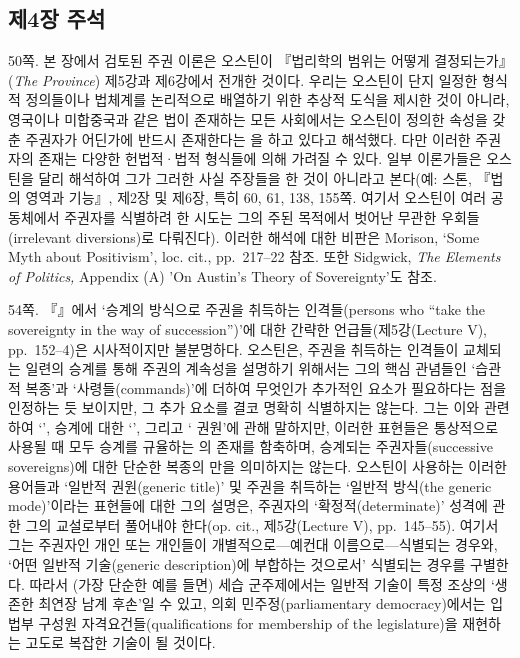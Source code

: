 \newpage

\subsection{제4장 주석}\label{uxc81c4uxc7a5-uxc8fcuxc11d}


{\footnotesize
\noteentry 50쪽.  본 장에서 검토된 주권 이론은 오스틴이
『법리학의 범위는 어떻게 결정되는가』(\emph{The Province}) 제5강과
제6강에서 전개한 것이다. 우리는 오스틴이 단지 일정한 형식적 정의들이나
법체계를 논리적으로 배열하기 위한 추상적 도식을 제시한 것이 아니라,
영국이나 미합중국과 같은 법이 존재하는 모든 사회에서는 오스틴이 정의한
속성을 갖춘 주권자가 어딘가에 반드시 존재한다는 을 하고 있다고 해석했다. 다만 이러한 주권자의 존재는 다양한
헌법적·법적 형식들에 의해 가려질 수 있다. 일부 이론가들은 오스틴을 달리
해석하여 그가 그러한 사실 주장들을 한 것이 아니라고 본다(예: 스톤,
『법의 영역과 기능』, 제2장 및 제6장, 특히 60, 61, 138, 155쪽. 여기서
오스틴이 여러 공동체에서 주권자를 식별하려 한 시도는 그의 주된 목적에서
벗어난 무관한 우회들(irrelevant diversions)로 다뤄진다). 이러한 해석에
대한 비판은 Morison, `Some Myth about Positivism', loc. cit.,
pp.~217--22 참조. 또한 Sidgwick, \emph{The Elements of Politics,}
Appendix (A) 'On Austin's Theory of Sovereignty'도 참조.

\noteentry 54쪽.  『』에서 ‘승계의 방식으로 주권을 취득하는
인격들(persons who “take the sovereignty in the way of succession”)’에
대한 간략한 언급들(제5강(Lecture V), pp.~152--4)은 시사적이지만
불분명하다. 오스틴은, 주권을 취득하는 인격들이 교체되는 일련의 승계를
통해 주권의 계속성을 설명하기 위해서는 그의 핵심 관념들인 ‘습관적
복종’과 ‘사령들(commands)’에 더하여 무엇인가 추가적인 요소가 필요하다는
점을 인정하는 듯 보이지만, 그 추가 요소를 결코 명확히 식별하지는 않는다.
그는 이와 관련하여 ‘’, 승계에 대한
‘’, 그리고 ‘ 권원’에 관해
말하지만, 이러한 표현들은 통상적으로 사용될 때 모두 승계를 규율하는
의 존재를 함축하며, 승계되는 주권자들(successive
sovereigns)에 대한 단순한 복종의 만을 의미하지는 않는다.
오스틴이 사용하는 이러한 용어들과 ‘일반적 권원(generic title)’ 및 주권을
취득하는 ‘일반적 방식(the generic mode)’이라는 표현들에 대한 그의
설명은, 주권자의 ‘확정적(determinate)’ 성격에 관한 그의 교설로부터
풀어내야 한다(op. cit., 제5강(Lecture V), pp.~145--55). 여기서 그는
주권자인 개인 또는 개인들이 개별적으로---예컨대 이름으로---식별되는
경우와, ‘어떤 일반적 기술(generic description)에 부합하는 것으로서’
식별되는 경우를 구별한다. 따라서 (가장 단순한 예를 들면) 세습
군주제에서는 일반적 기술이 특정 조상의 ‘생존한 최연장 남계 후손’일 수
있고, 의회 민주정(parliamentary democracy)에서는 입법부 구성원
자격요건들(qualifications for membership of the legislature)을 재현하는
고도로 복잡한 기술이 될 것이다.

}
